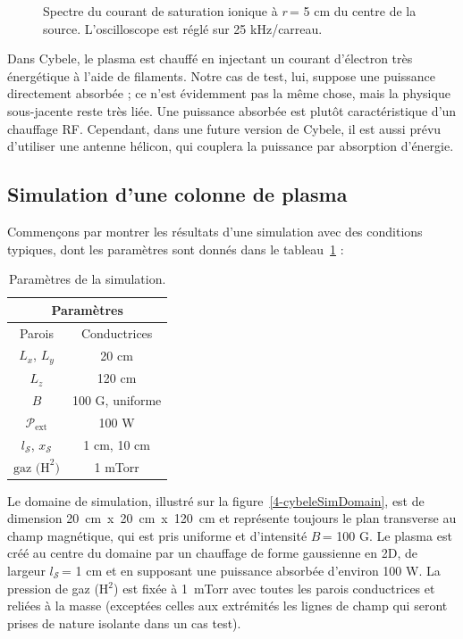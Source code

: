 \begin{refsection}
\begin{figure}[!htbp]
    \caption{Spectre du courant de saturation
    ionique à $r\,$= 5 cm du centre de la source.
    L'oscilloscope est réglé sur 25 kHz/carreau.\label{4-CybeleFourierSignal}}
\end{figure}

Dans Cybele, le plasma est chauffé en injectant un courant
d'électron très énergétique à l'aide de filaments. Notre cas de
test, lui, suppose une puissance directement absorbée ; ce n'est évidemment pas
la même chose, mais la physique sous-jacente reste très liée. Une puissance
absorbée est plutôt caractéristique d'un chauffage RF. Cependant, dans une future version de Cybele, il est aussi
prévu d'utiliser une antenne hélicon, qui couplera la puissance par absorption d'énergie.
 
\subsection{Simulation d'une colonne de plasma}

Commençons par montrer les résultats d'une simulation avec des conditions
typiques, dont les paramètres sont donnés dans le tableau~\ref{4-CybeleParam1} :

\begin{table}[!htbp]
\footnotesize\centering
{}
\begin{tabular}{cc}\toprule
\multicolumn{2}{c}{\bf Paramètres}\\
\midrule 
Parois & Conductrices\\
$L_x$, $L_y$ & 20 cm\\
$L_z$ & 120 cm\\
$B$&100 G, uniforme\\
$\mathcal{P}_\text{ext}$&100 W\\
$l_\mathcal{S}$, $x_\mathcal{S}$& 1 cm, 10 cm\\
$\text{gaz (H}^2\text{)}$ & 1 mTorr\\
\bottomrule
\end{tabular}
\caption{Paramètres de la simulation.}\label{4-CybeleParam1}
\end{table}

 Le domaine de
simulation, illustré sur la figure~\ref{4-cybeleSimDomain}, est de dimension
20~cm~x~20~cm~x~120~cm et représente toujours le plan transverse au champ
magnétique, qui est pris uniforme et d'intensité $B\,$= 100 G. Le plasma est créé au centre du domaine par un chauffage de forme gaussienne en 2D, de largeur $l_\mathcal{S}\,$= 1 cm et en supposant une puissance absorbée
d'environ 100 W.
La pression de gaz (H$^2$) est fixée à 1~mTorr avec toutes les parois
conductrices et reliées à la masse (exceptées celles aux extrémités les lignes
de champ qui seront prises de nature isolante dans un cas test).



\end{refsection}
